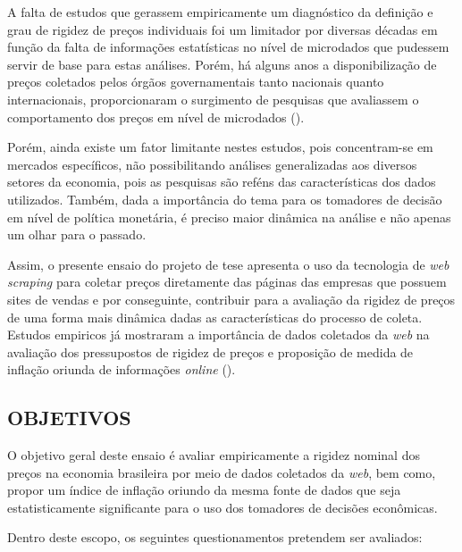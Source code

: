 \documentclass[twoside,a4paper,11pt]{report}
\begin{document}
A falta de estudos que gerassem empiricamente um diagnóstico da definição e grau de rigidez de preços individuais foi um limitador por diversas décadas em função da falta de informações estatísticas no nível de microdados que pudessem servir de base para estas análises. Porém, há alguns anos a disponibilização de preços coletados pelos órgãos governamentais tanto nacionais quanto internacionais, proporcionaram o surgimento de pesquisas que avaliassem o comportamento dos preços em nível de microdados (\citet{bils2004some,nakamura2008five,klenow2008state,dhyne2006price,gouvea2007nominal,matos2009comportamento,lopes2008rigidez,bunn2012examining}). 

Porém, ainda existe um fator limitante nestes estudos, pois concentram-se em mercados específicos, não possibilitando análises generalizadas aos diversos setores da economia, pois as pesquisas são reféns das características dos dados utilizados. Também, dada a importância do tema para os tomadores de decisão em nível de política monetária, é preciso maior dinâmica na análise e não apenas um olhar para o passado. 

Assim, o presente ensaio do projeto de tese apresenta o uso da tecnologia de \emph{web scraping} para coletar preços diretamente das páginas das empresas que possuem sites de vendas e por conseguinte, contribuir para a avaliação da rigidez de preços de uma forma mais dinâmica dadas as características do processo de coleta. Estudos empiricos já mostraram a importância de dados coletados da \emph{web} na avaliação dos pressupostos de rigidez de preços e proposição de medida de inflação oriunda de informações \emph{online} (\citet{cavallo2010scraped}).

\subsection*{OBJETIVOS}

O objetivo geral deste ensaio é avaliar empiricamente a rigidez nominal dos preços na economia brasileira por meio de dados coletados da \emph{web}, bem como, propor um índice de inflação oriundo da mesma fonte de dados que seja estatisticamente significante para o uso dos tomadores de decisões econômicas.

Dentro deste escopo, os seguintes questionamentos pretendem ser avaliados:
\end{document}
